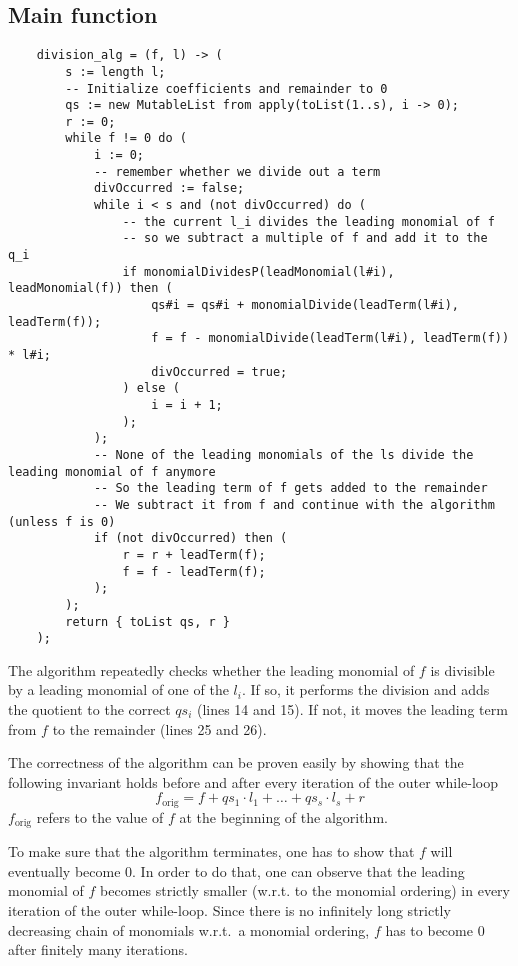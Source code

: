 \documentclass[a4paper]{scrartcl}
\begin{document}
\subsection{Main function}
\begin{lstlisting}
	division_alg = (f, l) -> (
		s := length l;
		-- Initialize coefficients and remainder to 0
		qs := new MutableList from apply(toList(1..s), i -> 0);
		r := 0;
		while f != 0 do (
			i := 0;
			-- remember whether we divide out a term
			divOccurred := false;
			while i < s and (not divOccurred) do (
				-- the current l_i divides the leading monomial of f
				-- so we subtract a multiple of f and add it to the q_i
				if monomialDividesP(leadMonomial(l#i), leadMonomial(f)) then (
					qs#i = qs#i + monomialDivide(leadTerm(l#i), leadTerm(f));
					f = f - monomialDivide(leadTerm(l#i), leadTerm(f)) * l#i;
					divOccurred = true;
				) else (
					i = i + 1;
				);
			);
			-- None of the leading monomials of the ls divide the leading monomial of f anymore
			-- So the leading term of f gets added to the remainder
			-- We subtract it from f and continue with the algorithm (unless f is 0)
			if (not divOccurred) then (
				r = r + leadTerm(f);
				f = f - leadTerm(f);
			);
		);
		return { toList qs, r }
	);
\end{lstlisting}
The algorithm repeatedly checks whether the leading monomial of $f$ is divisible by a leading monomial
of one of the $l_i$. If so, it performs the division and adds the quotient to the correct $qs_i$ (lines 14 and 15).
If not, it moves the leading term from $f$ to the remainder (lines 25 and 26).

The correctness of the algorithm can be proven easily by showing that the following invariant holds before and after
every iteration of the outer while-loop
$$f_{\mathrm{orig}} = f + qs_1 \cdot l_1 + \dots + qs_s \cdot l_s + r$$
$f_{\mathrm{orig}}$ refers to the value of $f$ at the beginning of the algorithm.

To make sure that the algorithm terminates, one has to show that $f$ will eventually become $0$.
In order to do that, one can observe that the leading monomial of $f$ becomes strictly smaller
(w.r.t. to the monomial ordering)
in every iteration of the outer while-loop.
Since there is no infinitely long strictly decreasing chain of monomials w.r.t.\ a monomial ordering,
$f$ has to become $0$ after finitely many iterations.
\nocite{*}


\end{document}
